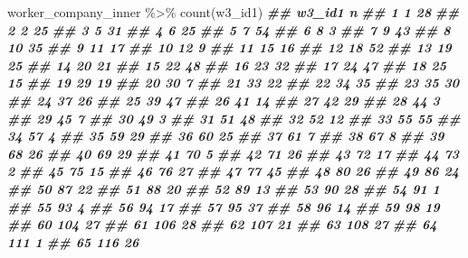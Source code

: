 \documentclass[
]{book}
\newenvironment{Shaded}{\begin{snugshade}}{\end{snugshade}}
\newcommand{\DocumentationTok}[1]{\textcolor[rgb]{0.56,0.35,0.01}{\textbf{\textit{#1}}}}
\newcommand{\FunctionTok}[1]{\textcolor[rgb]{0.00,0.00,0.00}{#1}}
\newcommand{\NormalTok}[1]{#1}
\newcommand{\SpecialCharTok}[1]{\textcolor[rgb]{0.00,0.00,0.00}{#1}}
\theoremstyle{definition}
\theoremstyle{definition}
\theoremstyle{definition}
\theoremstyle{definition}
\theoremstyle{remark}
\begin{document}
\begin{Shaded}
\begin{Highlighting}[]
\NormalTok{worker\_company\_inner }\SpecialCharTok{\%\textgreater{}\%} 
  \FunctionTok{count}\NormalTok{(w3\_id1)}
\DocumentationTok{\#\#     w3\_id1  n}
\DocumentationTok{\#\# 1        1 28}
\DocumentationTok{\#\# 2        2 25}
\DocumentationTok{\#\# 3        5 31}
\DocumentationTok{\#\# 4        6 25}
\DocumentationTok{\#\# 5        7 54}
\DocumentationTok{\#\# 6        8  3}
\DocumentationTok{\#\# 7        9 43}
\DocumentationTok{\#\# 8       10 35}
\DocumentationTok{\#\# 9       11 17}
\DocumentationTok{\#\# 10      12  9}
\DocumentationTok{\#\# 11      15 16}
\DocumentationTok{\#\# 12      18 52}
\DocumentationTok{\#\# 13      19 25}
\DocumentationTok{\#\# 14      20 21}
\DocumentationTok{\#\# 15      22 48}
\DocumentationTok{\#\# 16      23 32}
\DocumentationTok{\#\# 17      24 47}
\DocumentationTok{\#\# 18      25 15}
\DocumentationTok{\#\# 19      29 19}
\DocumentationTok{\#\# 20      30  7}
\DocumentationTok{\#\# 21      33 22}
\DocumentationTok{\#\# 22      34 35}
\DocumentationTok{\#\# 23      35 30}
\DocumentationTok{\#\# 24      37 26}
\DocumentationTok{\#\# 25      39 47}
\DocumentationTok{\#\# 26      41 14}
\DocumentationTok{\#\# 27      42 29}
\DocumentationTok{\#\# 28      44  3}
\DocumentationTok{\#\# 29      45  7}
\DocumentationTok{\#\# 30      49  3}
\DocumentationTok{\#\# 31      51 48}
\DocumentationTok{\#\# 32      52 12}
\DocumentationTok{\#\# 33      55 55}
\DocumentationTok{\#\# 34      57  4}
\DocumentationTok{\#\# 35      59 29}
\DocumentationTok{\#\# 36      60 25}
\DocumentationTok{\#\# 37      61  7}
\DocumentationTok{\#\# 38      67  8}
\DocumentationTok{\#\# 39      68 26}
\DocumentationTok{\#\# 40      69 29}
\DocumentationTok{\#\# 41      70  5}
\DocumentationTok{\#\# 42      71 26}
\DocumentationTok{\#\# 43      72 17}
\DocumentationTok{\#\# 44      73  2}
\DocumentationTok{\#\# 45      75 15}
\DocumentationTok{\#\# 46      76 27}
\DocumentationTok{\#\# 47      77 45}
\DocumentationTok{\#\# 48      80 26}
\DocumentationTok{\#\# 49      86 24}
\DocumentationTok{\#\# 50      87 22}
\DocumentationTok{\#\# 51      88 20}
\DocumentationTok{\#\# 52      89 13}
\DocumentationTok{\#\# 53      90 28}
\DocumentationTok{\#\# 54      91  1}
\DocumentationTok{\#\# 55      93  4}
\DocumentationTok{\#\# 56      94 17}
\DocumentationTok{\#\# 57      95 37}
\DocumentationTok{\#\# 58      96 14}
\DocumentationTok{\#\# 59      98 19}
\DocumentationTok{\#\# 60     104 27}
\DocumentationTok{\#\# 61     106 28}
\DocumentationTok{\#\# 62     107 21}
\DocumentationTok{\#\# 63     108 27}
\DocumentationTok{\#\# 64     111  1}
\DocumentationTok{\#\# 65     116 26}

\end{Highlighting}
\end{Shaded}
\end{document}

